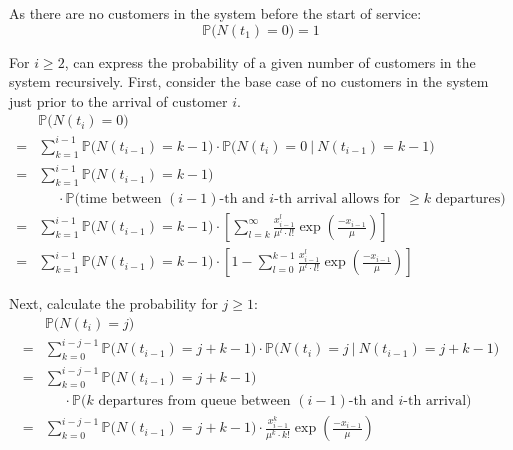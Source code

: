 As there are no customers in the system before the start of service:
\begin{equation}
	\mathbb{P} \Big( N (t_{1}) = 0 \Big) = 1
\end{equation}

For $i \geq 2$, can express the probability of a given number of customers in the system recursively. First, consider the base case of no customers in the system just prior to the arrival of customer $i$.
\begin{align*}
	& \mathbb{P} \Big( N (t_{i}) = 0 \Big) \\
	= & \sum_{k = 1}^{i - 1} \mathbb{P} \Big( N (t_{i - 1}) = k - 1 \Big) \cdot \mathbb{P} \Big( N (t_{i}) = 0 \ \Big| \ N (t_{i - 1}) = k - 1 \Big) \\
	= & \sum_{k = 1}^{i - 1} \mathbb{P} \Big( N (t_{i - 1})= k - 1 \Big) \\
	& \ \ \ \ \ \ \cdot \mathbb{P} \Big( \text{time between $(i - 1)$-th and $i$-th arrival allows for $\geq k$ departures} \Big) \\
	= & \sum_{k = 1}^{i - 1} \mathbb{P} \Big( N (t_{i - 1}) = k - 1 \Big) \cdot \left[ \sum_{l = k}^{\infty} \frac{x_{i - 1}^{l}}{\mu^{l} \cdot l!} \exp \left( \frac{- x_{i - 1}}{\mu} \right) \right] \\
	= & \sum_{k = 1}^{i - 1} \mathbb{P} \Big( N (t_{i - 1}) = k - 1 \Big) \cdot \left[ 1 - \sum_{l = 0}^{k - 1} \frac{x_{i - 1}^{l}}{\mu^{l} \cdot l!} \exp \left( \frac{- x_{i - 1}}{\mu} \right) \right]
\end{align*}

Next, calculate the probability for $j \geq 1$:
\begin{align*}
	& \mathbb{P} \Big( N (t_{i}) = j \Big) \\
	= & \sum_{k = 0}^{i - j - 1} \mathbb{P} \Big( N (t_{i - 1}) = j + k - 1 \Big) \cdot \mathbb{P} \Big( N (t_{i}) = j \ \Big| \ N (t_{i - 1}) = j + k - 1 \Big) \\
	= & \sum_{k = 0}^{i - j - 1} \mathbb{P} \Big( N (t_{i - 1}) = j + k - 1 \Big) \\
	& \ \ \ \ \ \ \cdot \mathbb{P} \Big( \text{$k$ departures from queue between $(i - 1)$-th and $i$-th arrival} \Big) \\
	= & \sum_{k = 0}^{i - j - 1} \mathbb{P} \Big( N (t_{i - 1}) = j + k - 1 \Big) \cdot \frac{x_{i - 1}^{k}}{\mu^{k} \cdot k!} \exp \left( \frac{- x_{i - 1}}{\mu} \right)
\end{align*}

